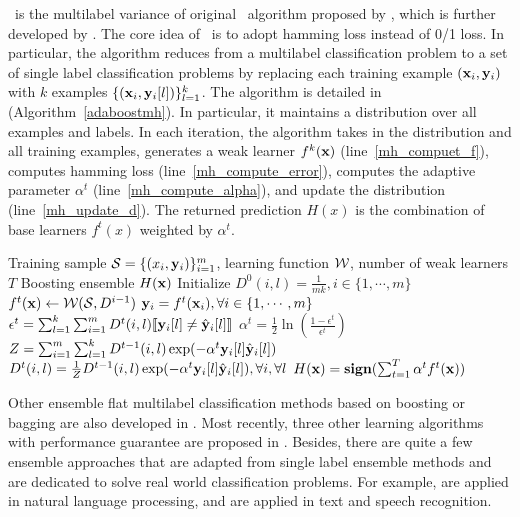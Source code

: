 {\adaboostmh\ is the multilabel variance of original \adaboost\ algorithm proposed by \citet{Schapire99improved}, which is further developed by \citet{Esuli2008boosting}.
The core idea of \adaboostmh\ is to adopt hamming loss instead of 0/1 loss. 
In particular, the algorithm reduces from a multilabel classification problem to a set of single label classification problems by replacing each training example $(\mathbf {x}_i,\mathbf {y}_i)$ with $k$ examples $\{(\mathbf {x}_i,\mathbf {y}_i[l])\}_{l=1}^k$.
The algorithm is detailed in (Algorithm~\ref{adaboostmh}).
In particular, it maintains a distribution over all examples and labels.
In each iteration, the algorithm takes in the distribution and all training examples, generates a weak learner $f^k(\mathbf {x})$ (line~\ref{mh_compuet_f}), computes hamming loss (line~\ref{mh_compute_error}), computes the adaptive parameter $\alpha^t$ (line~\ref{mh_compute_alpha}), and update the distribution (line~\ref{mh_update_d}).
The returned prediction $H(x)$ is the combination of base learners $f^t(x)$ weighted by $\alpha^t$.
\begin{algorithm}
\caption{\adaboostmh}
\label{adaboostmh}
\begin{algorithmic}[1]
	\REQUIRE Training sample $\mathcal{S} = \{(x_i,\mathbf {y}_i)\}_{i=1}^m$, learning function $\mathcal{W}$, number of weak learners $T$
	\ENSURE Boosting ensemble $H(\mathbf {x})$
	\STATE Initialize $D^0(i,l)=\frac{1}{mk},i\in\{1,\cdots,m\}$
		\STATE $f^t(\mathbf {x})\leftarrow\mathcal{W}(\mathcal{S},D^{i-1})$ \label{mh_compuet_f}
		\STATE $\mathbf {y}_i = f^t(\mathbf {x}_i),\forall i\in\{1,\cdots,m\}$
		\STATE $\epsilon^t =\sum_{l=1}^k\sum_{i=1}^{m}D^t(i,l){\llbracket \mathbf {y}_i[l]\neq\hat{\mathbf {y}}_i[l] \rrbracket}$ \label{mh_compute_error}
		\STATE $\alpha^{t} = \frac{1}{2}\ln\left(\frac{1-\epsilon^t}{\epsilon^t}\right)$ \label{mh_compute_alpha}
		\STATE $Z=\sum_{i=1}^{m}\sum_{l=1}^{k}D^{t-1}(i,l)\exp(-\alpha^t\mathbf {y}_i[l]\hat{\mathbf {y}}_i[l])$
		\STATE $D^t(i,l) = \frac{1}{Z}D^{t-1}(i,l)\exp(-\alpha^t\mathbf {y}_i[l]\hat{\mathbf {y}}_i[l]),\forall i,\forall l$ \label{mh_update_d}
	\ENDFOR
	\RETURN $H(\mathbf {x}) = \textbf{sign}(\sum_{t=1}^T\alpha^tf^t(\mathbf {x}))$
\end{algorithmic}
\end{algorithm}

Other ensemble flat multilabel classification methods based on boosting or bagging are also developed in \citep{Wang07simple,Yan07model,Kocev13tree}.
Most recently, three other learning algorithms with performance guarantee are proposed in \citep{Cortes14semble}.
Besides, there are quite a few ensemble approaches that are adapted from single label ensemble methods and are dedicated to solve real world classification problems.
For example, \citep{Collins05distrimnative,Zeman05improving,Sagae06parsing,Zhang09kbest} are applied in natural language processing, and \citep{Fiscus97a,Benesty08speech,Petrov10products}
are applied in text and speech recognition.


}
